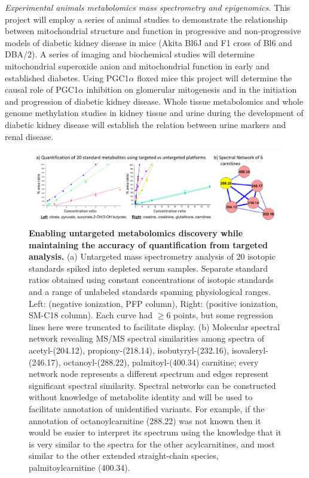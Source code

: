 \documentclass[arial,11pt]{article}
\begin{document}
{\em Experimental animals metabolomics mass spectrometry and epigenomics.} This project will employ a series of animal studies to demonstrate the relationship between mitochondrial structure and function in progressive and non-progressive models of diabetic kidney disease in mice (Akita Bl6J and F1 cross of Bl6 and DBA/2). A series of imaging and biochemical studies will determine mitochondrial superoxide anion and mitochondrial function in early and established diabetes. Using \mbox{PGC1$\alpha$} floxed mice this project will determine the causal role of \mbox{PGC1$\alpha$} inhibition on glomerular mitogenesis and in the initiation and progression of diabetic kidney disease. Whole tissue metabolomics and whole genome methylation studies in kidney tissue and urine during the development of diabetic kidney disease will establish the relation between urine markers and renal disease. %

\begin{figure}[ht!]
    \includegraphics[width=\textwidth]{figures/figSpecNets.pdf}
  \caption{{\bf Enabling untargeted metabolomics discovery while maintaining the
accuracy of quantification from targeted analysis.} (a) Untargeted mass spectrometry analysis of 20 isotopic standards spiked into depleted serum samples. Separate standard ratios obtained using constant concentrations of isotopic standards and a range of unlabeled standards spanning physiological ranges. %
Left: (negative ionization, PFP column), Right: (positive ionization, SM-C18 column). Each curve had $\geq 6$ points, but some regression lines here were truncated to facilitate display. (b) Molecular spectral network revealing MS/MS spectral similarities among spectra of acetyl-(204.12), propiony-(218.14), isobutyryl-(232.16), isovaleryl-(246.17), octanoyl-(288.22), palmitoyl-(400.34) carnitine; every network node represents a different spectrum and edges represent significant spectral similarity. Spectral networks can be constructed without knowledge of metabolite identity and will
be used to facilitate annotation of unidentified variants. For example, if the annotation of octanoylcarnitine (288.22) was not known then it would be easier to interpret its spectrum using the knowledge that it is very similar to the spectra for the other acylcarnitines, and most similar to the other extended straight-chain species, palmitoylcarnitine (400.34).}
  \label{fig.dbp.sharma.molnets}
\end{figure}
\end{document}
